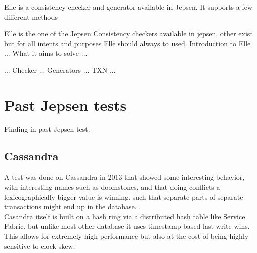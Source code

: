 \documentclass[a4paper,10pt,titlepage]{report}
\begin{document}
Elle is a consistency checker and generator available in Jepsen. It supports a few different methods 

Elle is the one of the Jepsen Consistency checkers available in jepsen, other exist but for all intents and purposes Elle should always to used. 
Introduction to Elle
...
What it aims to solve
...

...
Checker
...
Generators
...
TXN
...










\section{Past Jepsen tests}
    Finding in past Jepsen test.
\subsection{Cassandra}
A test was done on Cassandra in 2013 that showed some interesting behavior, with interesting names such as doomstones, and that doing conflicts a lexicographically bigger value is winning. such that separate parts of separate transactions might end up in the database. .\\
\vspace{5mm}
Casandra itself is built on a hash ring via a distributed hash table like Service Fabric. but unlike most other database it uses timestamp based last write wins. This allows for extremely high performance but also at the cost of being highly sensitive to clock skew.\\
\end{document}
